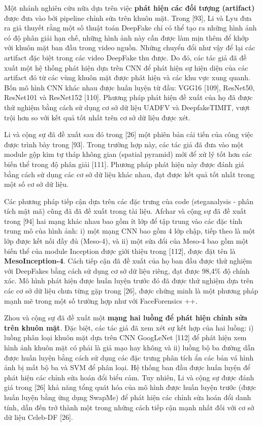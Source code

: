 \documentclass{article}
\begin{document}
Một nhánh nghiên cứu nữa dựa trên việc \textbf{phát hiện các đối tượng (artifact)} được đưa vào bởi pipeline chỉnh sửa trên khuôn mặt. Trong [93], Li và Lyu đưa ra giả thuyết rằng một số thuật toán DeepFake chỉ có thể tạo ra những hình ảnh có độ phân giải hạn chế, những hình ảnh này cần được làm mịn thêm để khớp với khuôn mặt ban đầu trong video nguồn. Những chuyển đổi như vậy để lại các artifact đặc biệt trong các video DeepFake thu được. Do đó, các tác giả đã đề xuất một hệ thống phát hiện dựa trên CNN để phát hiện sự hiện diện của các artifact đó từ các vùng khuôn mặt được phát hiện và các khu vực xung quanh. Bốn mô hình CNN khác nhau được huấn luyện từ đầu: VGG16 [109], ResNet50, ResNet101 và ResNet152 [110]. Phương pháp phát hiện đề xuất của họ đã được thử nghiệm bằng cách sử dụng cơ sở dữ liệu UADFV và DeepfakeTIMIT, vượt trội hơn so với kết quả tốt nhất trên cơ sở dữ liệu được xét.

Li và cộng sự đã đề xuất sau đó trong [26] một phiên bản cải tiến của công việc được trình bày trong [93]. Trong trường hợp này, các tác giả đã đưa vào một module gộp kim tự tháp không gian (spatial pyramid) mới để xử lý tốt hơn các biến thể trong độ phân giải [111]. Phương pháp phát hiện này được đánh giá bằng cách sử dụng các cơ sở dữ liệu khác nhau, đạt được kết quả tốt nhất trong một số cơ sở dữ liệu.

Các phương pháp tiếp cận dựa trên các đặc trưng của code (steganalysis - phân tích mật mã) cũng đã đã đề xuất trong tài liệu. Afchar và cộng sự đã đề xuất trong [94] hai mạng khác nhau bao gồm ít lớp để tập trung vào các đặc tính trung mô của hình ảnh: i) một mạng CNN bao gồm 4 lớp chập, tiếp theo là một lớp được kết nối đầy đủ (Meso-4), và ii) một sửa đổi của Meso-4 bao gồm một biến thể của module Inception được giới thiệu trong [112], được đặt tên là \textbf{MesoInception-4}. Cách tiếp cận đã đề xuất của họ ban đầu được thử nghiệm với DeepFakes bằng cách sử dụng cơ sở dữ liệu riêng, đạt được 98,4\% độ chính xác. Mô hình phát hiện được huấn luyện trước đó đã được thử nghiệm dựa trên các cơ sở dữ liệu chưa từng gặp trong [26], được chứng minh là một phương pháp mạnh mẽ trong một số trường hợp như với FaceForensics ++.

Zhou và cộng sự đã đề xuất một \textbf{mạng hai luồng để phát hiện chỉnh sửa trên khuôn mặt}. Đặc biệt, các tác giả đã xem xét sự kết hợp của hai luồng: i) luồng phân loại khuôn mặt dựa trên CNN GoogLeNet [112] để phát hiện xem hình ảnh khuôn mặt có phải là giả mạo hay không và ii) luồng bộ ba đường dẫn được huấn luyện bằng cách sử dụng các đặc trưng phân tích ẩn các bản vá hình ảnh bị mất bộ ba và SVM để phân loại. Hệ thống ban đầu được huấn luyện để phát hiện các chỉnh sửa hoán đổi biểu cảm. Tuy nhiên, Li và cộng sự được đánh giá trong [26] khả năng tổng quát hóa của mô hình được huấn luyện trước (được huấn luyện bằng ứng dụng SwapMe) để phát hiện các chỉnh sửa hoán đổi danh tính, dẫn đến trở thành một trong những cách tiếp cận mạnh nhất đối với cơ sở dữ liệu Celeb-DF [26].
\end{document}
